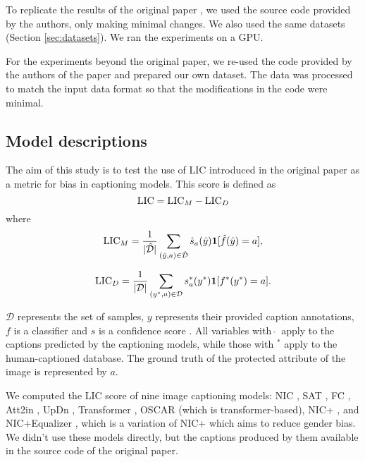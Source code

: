 To replicate the results of the original paper \cite{Hirota2022}, we used the source code provided by the authors, only making minimal changes. We also used the same datasets (Section \ref{sec:datasets}). We ran the experiments on a GPU.

For the experiments beyond the original paper, we re-used the code provided by the authors of the paper and prepared our own dataset. The data was processed to match the input data format so that the modifications in the code were minimal.

\subsection{Model descriptions}

The aim of this study is to test the use of LIC introduced in the original paper \cite{Hirota2022} as a metric for bias in captioning models. This score is defined as
\begin{equation}
\textup{LIC} = \textup{LIC}_M - \textup{LIC}_D
\end{equation}
where
\begin{equation}
\textup{LIC}_M = \frac{1}{|\hat{\mathcal{D}}|} \sum_{(\hat{y}, a) \in \hat{\mathcal{D}}} \hat{s}_a(\hat{y})\mathbf{1}[\hat{f}(\hat{y}) = a]\text ,
\end{equation}

\begin{equation}
\textup{LIC}_D = \frac{1}{|\mathcal{D}|} \sum_{(y^*, a) \in \mathcal{D}} s^*_a (y^*) \mathbf{1}[f^*(y^*) = a]\text .
\end{equation}

$\mathcal{D}$ represents the set of samples, $y$ represents their provided caption annotations, $f$ is a classifier and $s$ is a confidence score \cite{Hirota2022}. All variables with $\,\hat{ }\,$ apply to the captions predicted by the captioning models, while those with $^*$ apply to the human-captioned database. The ground truth of the protected attribute of the image is represented by $a$.


We computed the LIC score of nine image captioning models: NIC \cite{NIC}, SAT \cite{SAT}, FC \cite{Rennie2017}, Att2in \cite{Rennie2017}, UpDn  \cite{UpDn}, Transformer \cite{Transformer}, OSCAR \cite{OSCAR} (which is transformer-based), NIC+ \cite{Burns2018}, and NIC+Equalizer \cite{Burns2018}, which is a variation of NIC+ which aims to reduce gender bias. We didn't use these models directly, but the captions produced by them available in the source code of the original paper.


